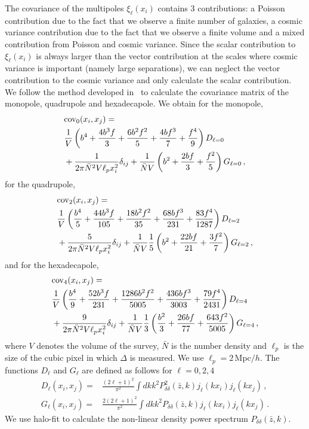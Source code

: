\documentclass[a4paper,twocolumn,aps,prd,nolongbibliography,superscriptaddress,showpacs,showkeys,amsmath,amssymb,floatfix,nofootinbib]{revtex4-1}
\renewcommand{\[}{\begin{equation}}
\renewcommand{\]}{\end{equation}}
\begin{document}
The covariance of the multipoles $\xi_\ell(x_i)$ contains 3 contributions: a Poisson contribution due to the fact that we observe a finite number of galaxies, a cosmic variance contribution due to the fact that we observe a finite volume and a mixed contribution from Poisson and cosmic variance. Since the scalar contribution to $\xi_\ell(x_i)$ is always larger than the vector contribution at the scales where cosmic variance is important (namely large separations), we can neglect the vector contribution to the cosmic variance and only calculate the scalar contribution. We follow the method developed in~\cite{Bonvin:2015kuc,Hall:2016bmm} to calculate the covariance matrix of the monopole, quadrupole and hexadecapole. We obtain for the monopole,
\begin{align}
&{\rm cov}_0(x_i,x_j)=\label{cov0}\\
&\frac{1}{V}\left(b^4+\frac{4b^3f}{3}+\frac{6b^2f^2}{5}+\frac{4bf^3}{7}+\frac{f^4}{9} \right) D_{\ell=0}\nonumber\\
&+\frac{1}{2\pi \bar N^2 V \ell_p  x_i^2}\delta_{ij}+\frac{1}{\bar N V}\left(b^2+\frac{2bf}{3}+\frac{f^2}{5} \right) G_{\ell=0}\nonumber\, ,
\end{align}
for the quadrupole,
\begin{align}
&{\rm cov}_2(x_i,x_j)=\label{cov2}\\
&\frac{1}{V}\left(\frac{b^4}{5}+\frac{44b^3f}{105}+\frac{18b^2f^2}{35}+\frac{68bf^3}{231}+\frac{83f^4}{1287} \right) D_{\ell=2}\nonumber\\
&+\frac{5}{2\pi \bar N^2 V \ell_p  x_i^2}\delta_{ij}+\frac{1}{\bar N V}\frac{1}{5}\left(b^2+\frac{22bf}{21}+\frac{3f^2}{7} \right) G_{\ell=2}\nonumber\, ,
\end{align}
and for the hexadecapole,
\begin{align}
&{\rm cov}_4(x_i,x_j)=\label{cov4}\\
&\frac{1}{V}\left(\frac{b^4}{9}+\frac{52b^3f}{231}+\frac{1286b^2f^2}{5005}+\frac{436bf^3}{3003}+\frac{79f^4}{2431} \right) D_{\ell=4}\nonumber\\
&+\frac{9}{2\pi \bar N^2 V \ell_p x_i^2}\delta_{ij}+\frac{1}{\bar N V}\frac{1}{3}\left(\frac{b^2}{3}+\frac{26bf}{77}+\frac{643f^2}{5005} \right) G_{\ell=4}\nonumber\, ,
\end{align}
where $V$ denotes the volume of the survey, $\bar N$ is the number density and $\ell_p$ is the size of the cubic pixel in which $\Delta$ is measured. We use $\ell_p=2$\,Mpc$/h$.
The functions $D_\ell$ and $G_\ell$ are defined as follows for $\ell=0,2,4$
\begin{align}
D_\ell(x_i,x_j)=&\frac{(2\ell+1)^2}{\pi^2}\int dk k^2 P_{\delta\delta}^2(\bar z, k)j_\ell(kx_i)j_\ell(kx_j)\, ,\\
G_\ell(x_i,x_j)=&\frac{2(2\ell+1)^2}{\pi^2}\int dk k^2 P_{\delta\delta}(\bar z, k)j_\ell(kx_i)j_\ell(kx_j)\, .
\end{align}
We use halo-fit to calculate the non-linear density power spectrum $P_{\delta\delta}(\bar z, k)$. 







\end{document}
